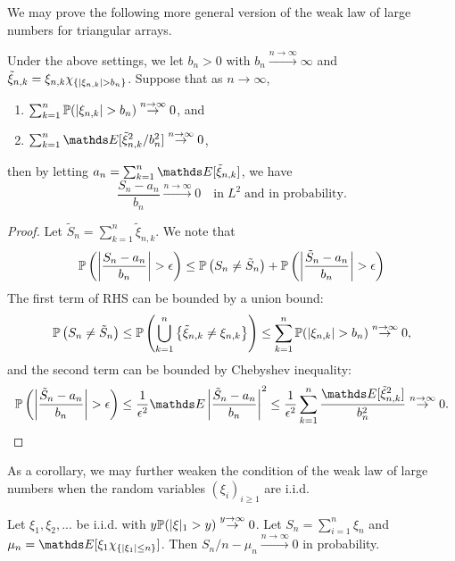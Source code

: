\begin{unexaminable}
We may prove the following more general version of the weak law of large numbers for triangular arrays.
\begin{theorem}
Under the above settings, we let $b_n > 0$ with $b_n \overset{n\to\infty}\to \infty$ and $\tilde{\xi}_{n,k} = \xi_{n,k} \chi_{\left\{ |\xi_{n,k}| > b_n \right \}}$. Suppose that as $n\to\infty$,
\begin{enumerate}
\item $\sum_{k=1}^n \mathbb{P}(|\xi_{n,k}| > b_n) \overset{n\to\infty}\to 0$, and
\item $\sum_{k=1}^n \E[\tilde{\xi}_{n,k}^2 / b_n^2] \overset{n\to\infty}\to 0$,
\end{enumerate}
then by letting $a_n = \sum_{k=1}^n \E[\tilde{\xi}_{n,k}]$, we have 
\begin{equation*}
\frac{S_n - a_n}{b_n} \overset{n\to\infty}\to 0 \quad \text{in} \; L^2 \; \text{and in probability.}
\end{equation*}
\end{theorem}

\begin{proof}
Let $\tilde{S}_n = \sum_{k=1}^n \tilde{\xi}_{n,k}$. We note that 
\begin{equation*}
\mathbb{P}\left( \left| \frac{S_n - a_n}{b_n} \right| > \epsilon \right) \leq \mathbb{P}\left( S_n \neq \tilde{S}_n \right) + \mathbb{P}\left( \left| \frac{\tilde{S}_n - a_n}{b_n} \right| > \epsilon \right)
\end{equation*}
The first term of RHS can be bounded by a union bound:
\begin{equation*}
    \mathbb{P}\left( S_n \neq \tilde{S}_n \right) \leq \mathbb{P}\left( \bigcup_{k=1}^n \left\{ \tilde{\xi}_{n,k} \neq \xi_{n,k} \right \} \right) \leq \sum_{k=1}^n \mathbb{P}(|\xi_{n,k}| > b_n) \overset{n\to\infty}\to 0, 
\end{equation*}
and the second term can be bounded by Chebyshev inequality:
\begin{align*}
\p\bracket{\abs{\frac{\tilde{S}_n - a_n}{b_n}} > \epsilon} \leq \frac{1}{\epsilon^2} \E\abs{\frac{\tilde{S}_n - a_n}{b_n}}^2 \leq \frac{1}{\epsilon^2} \sum_{k=1}^n \frac{\E[\tilde{\xi}_{n,k}^2]}{b_n^2} \overset{n\to\infty}\to 0.
\end{align*}
\end{proof}

As a corollary, we may further weaken the condition of the weak law of large numbers when the random variables $(\xi_i)_{i\geq 1}$ are i.i.d.

\begin{corollary}
Let $\xi_1, \xi_2, ...$ be i.i.d. with $y\mathbb{P}(|\xi|_1 > y) \overset{y\to\infty}\to 0$. Let $S_n = \sum_{i=1}^n \xi_n$ and $\mu_n = \E[\xi_1 \chi_{\set{|\xi_1|\leq n}}]$. Then $S_n/n - \mu_n \overset{n\to\infty}\to 0$ in probability.
\end{corollary}


\end{unexaminable}
